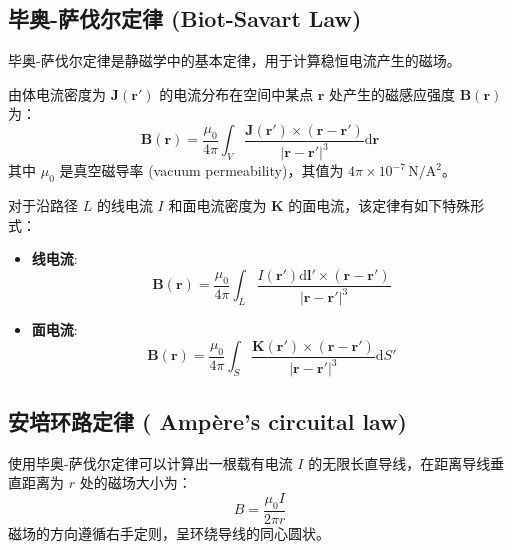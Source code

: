 \documentclass[fontset=none]{ctexart}
\begin{document}
\subsection{毕奥-萨伐尔定律 (Biot-Savart Law)}
毕奥-萨伐尔定律是静磁学中的基本定律，用于计算稳恒电流产生的磁场。
\begin{theorem}[毕奥-萨伐尔定律]
    由体电流密度为 $\bm{J}(\bm{r'})$ 的电流分布在空间中某点 $\bm{r}$ 处产生的磁感应强度 $\bm{B}(\bm{r})$ 为：
    \begin{equation}
        \bm{B}(\bm{r}) 
        = \frac{\mu_0}{4\pi} \int_V \frac{\bm{J}(\bm{r'}) 
        \times (\bm{r}-\bm{r'})}{|\bm{r}-\bm{r'}|^3} \mathrm{d}\bm{r}
    \end{equation}
    其中 $\mu_0$ 是真空磁导率 (vacuum permeability)，其值为 $4\pi \times 10^{-7} \, \mathrm{N/A^2}$。

    对于沿路径 $L$ 的线电流 $I$ 和面电流密度为 $\bm{K}$ 的面电流，该定律有如下特殊形式：
    \begin{itemize}
        \item \textbf{线电流}: 
        \begin{equation}
        \bm{B}(\bm{r}) = \frac{\mu_0}{4\pi} \int_L \frac{I(\bm{r'})\mathrm{d}\bm{l'} 
        \times (\bm{r}-\bm{r'})}{|\bm{r}-\bm{r'}|^3}
        \end{equation}
        \item \textbf{面电流}: 
        \begin{equation}
        \bm{B}(\bm{r}) = \frac{\mu_0}{4\pi} \int_S \frac{\bm{K}(\bm{r'}) 
        \times (\bm{r}-\bm{r'})}{|\bm{r}-\bm{r'}|^3} \mathrm{d}S'
        \end{equation}
    \end{itemize}
\end{theorem}

\subsection{安培环路定律 ( Ampère's circuital law)}
\begin{example}[无限长直导线的磁场]
    使用毕奥-萨伐尔定律可以计算出一根载有电流 $I$ 的无限长直导线，在距离导线垂直距离为 $r$ 处的磁场大小为：
    \begin{equation}
        B = \frac{\mu_0 I}{2\pi r}
    \end{equation}
    磁场的方向遵循右手定则，呈环绕导线的同心圆状。
\end{example}
\end{document}

